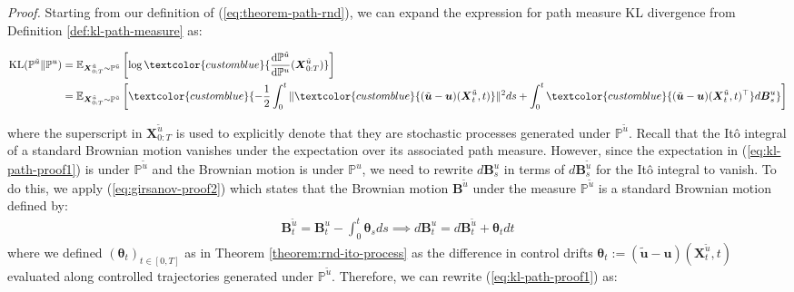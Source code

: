 \documentclass{article}
\newcommand{\bluetext}[1]{\textcolor{customblue}{#1}}
\begin{document}
\textit{Proof. }Starting from our definition of (\ref{eq:theorem-path-rnd}), we can expand the expression for path measure KL divergence from Definition \ref{def:kl-path-measure} as:
\begin{small}
\begin{align}
    \text{KL}(\mathbb{P}^{\tilde{u}}\|\mathbb{P}^u)&=\mathbb{E}_{\boldsymbol{X}^{\tilde{u}}_{0:T}\sim\mathbb{P}^{\tilde{u}}}\left[\log \bluetext{\frac{\mathrm{d}\mathbb{P}^{\tilde{u}}}{\mathrm{d}\mathbb{P}^u}(\boldsymbol{X}^{\tilde{u}}_{0:T})}\right]\nonumber\\
    &=\mathbb{E}_{\boldsymbol{X}^{\tilde{u}}_{0:T}\sim\mathbb{P}^{\tilde{u}}}\left[\bluetext{-\frac{1}{2}\int_0^t\|\bluetext{(\tilde{\boldsymbol{u}}-\boldsymbol{u})(\boldsymbol{X}^{\tilde{u}}_t,t)}\|^2ds+\int_0^t\bluetext{(\tilde{\boldsymbol{u}}-\boldsymbol{u})(\boldsymbol{X}^{\tilde{u}}_t,t)^\top} d\boldsymbol{B}^u_s}\right]\label{eq:kl-path-proof1}
\end{align}
\end{small}
where the superscript in $\boldsymbol{X}^{\tilde{u}}_{0:T}$ is used to explicitly denote that they are stochastic processes generated under $\mathbb{P}^{\tilde{u}}$. Recall that the Itô integral of a standard Brownian motion vanishes under the expectation over its associated path measure. However, since the expectation in (\ref{eq:kl-path-proof1}) is under $\mathbb{P}^{\tilde{u}}$ and the Brownian motion is under $\mathbb{P}^{u}$, we need to rewrite $d\boldsymbol{B}^u_s$ in terms of $d\boldsymbol{B}^{\tilde{u}}_s$ for the Itô integral to vanish. To do this, we apply (\ref{eq:girsanov-proof2}) which states that the Brownian motion $\boldsymbol{B}^{\tilde{u}}$ under the measure $\mathbb{P}^{\tilde{u}}$ is a standard Brownian motion defined by:
\begin{align}
    \boldsymbol{B}^{\tilde{u}}_t=\boldsymbol{B}_t^u-\int_0^t\boldsymbol{\theta}_sds\implies d\boldsymbol{B}_t^u=d\boldsymbol{B}^{\tilde{u}}_t+\boldsymbol{\theta}_tdt
\end{align}
where we defined $(\boldsymbol{\theta}_t)_{t\in [0,T]}$ as in Theorem \ref{theorem:rnd-ito-process} as the difference in control drifts $\boldsymbol{\theta}_t:=(\tilde{\boldsymbol{u}}-\boldsymbol{u})(\boldsymbol{X}^{\tilde{u}}_t,t)$ evaluated along controlled trajectories generated under $\mathbb{P}^{\tilde{u}}$. Therefore, we can rewrite (\ref{eq:kl-path-proof1}) as:
\end{document}
